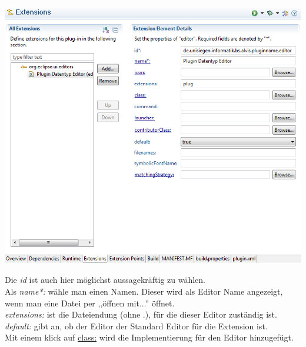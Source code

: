 \documentclass[10pt,a4paper]{article}
\begin{document}
\begin{center}
\includegraphics[scale=0.625]{images/new_plugin_editor_00}
\end{center}

Die \textit{id} ist auch hier möglichst aussagekräftig zu wählen.\\
Als \textit{name*:} wähle man einen Namen. Dieser wird als Editor Name angezeigt, wenn man eine Datei per ,,öffnen mit...'' öffnet.\\
\textit{extensions:} ist die Dateiendung (ohne .), für die dieser Editor zuständig ist.\\
\textit{default:} gibt an, ob der Editor der Standard Editor für die Extension ist.\\


Mit einem klick auf \underline{class:} wird die Implementierung für den Editor hinzugefügt.
\end{document}
